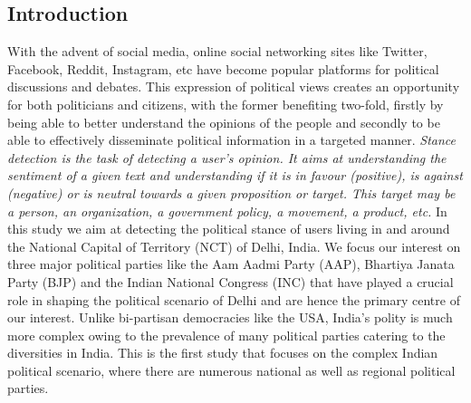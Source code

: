 \documentclass[a0,portrait]{a0poster}
\begin{document}
\begin{multicols}{2}
\color{SaddleBrown} %

\section*{Introduction}

With the advent of social media, online social networking sites like Twitter, Facebook, Reddit, Instagram, etc have become popular platforms for political discussions and debates. This expression of political views creates an opportunity for both politicians and citizens, with the former benefiting two-fold, firstly by being able to better understand the opinions of the people and secondly to be able to effectively disseminate political information in a targeted manner.
\textit{Stance detection is the task of detecting a user’s opinion. It aims at understanding the sentiment of a given text and understanding if it is in favour (positive), is against (negative) or is neutral towards a given proposition or target. This target may be a person, an organization, a government policy, a movement, a product, etc.}
In this study we aim at detecting the political stance of users living in and around the National Capital of Territory (NCT) of Delhi, India. We focus our interest on three major political parties like the Aam Aadmi Party (AAP), Bhartiya Janata Party (BJP) and the Indian National Congress (INC) that have played a crucial role in shaping the political scenario of Delhi and are hence the primary centre of our interest.
Unlike bi-partisan democracies like the USA, India's polity is much more complex owing to the prevalence of many political parties catering to the diversities in India. This is the first study that focuses on the complex Indian political scenario, where there are numerous national as well as regional political parties.


\color{DarkSlateGray} %


\end{multicols}
\end{document}
